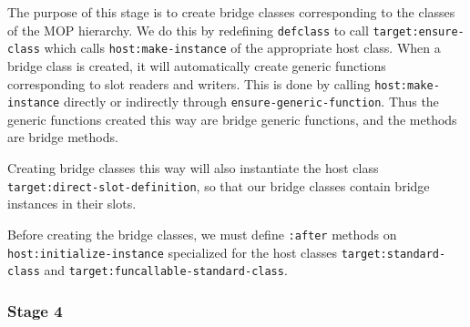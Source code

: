 The purpose of this stage is to create bridge classes corresponding to
the classes of the MOP hierarchy.  We do this by redefining
\texttt{defclass} to call \texttt{target:ensure-class} which calls
\texttt{host:make-instance} of the appropriate host class.  When a
bridge class is created, it will automatically create generic
functions corresponding to slot readers and writers.  This is done by
calling \texttt{host:make-instance} directly or indirectly through
\texttt{ensure-generic-function}.  Thus the generic functions created
this way are bridge generic functions, and the methods are bridge
methods.

Creating bridge classes this way will also instantiate the host class
\texttt{target:direct-slot-definition}, so that our bridge classes
contain bridge instances in their slots. 

Before creating the bridge classes, we must define \texttt{:after}
methods on \texttt{host:initialize-instance} specialized for the host
classes \texttt{target:standard-class} and
\texttt{target:funcallable-standard-class}.  

\subsubsection{Stage 4}

